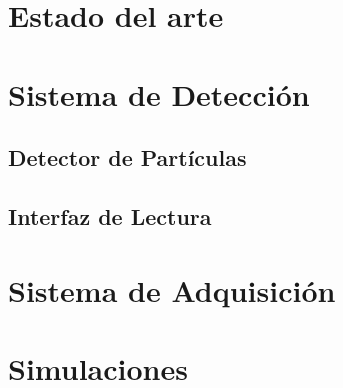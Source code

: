 \documentclass[11pt,letterpaper,oneside]{phstylee}
\begin{document}
\newpage
\thispagestyle{empty}
\cleardoublepage
%
%

\chapter{Estado del arte}
\label{cap:art}


\newpage
\thispagestyle{empty}
\cleardoublepage

\newpage
\thispagestyle{empty}
\cleardoublepage

\chapter{Sistema de Detección}
\label{cap:sdet}

\section{Detector de Partículas}
\label{sec:stgc}
%

\section{Interfaz de Lectura}
\label{sec:asd}
%

\newpage
\thispagestyle{empty}
\cleardoublepage

\chapter{Sistema de Adquisición}
\label{cap:sadq}
%

\newpage
\thispagestyle{empty}
\cleardoublepage

\chapter{Simulaciones}
\label{cap:sim}
%

\newpage
\thispagestyle{empty}
\cleardoublepage

%
\end{document}
